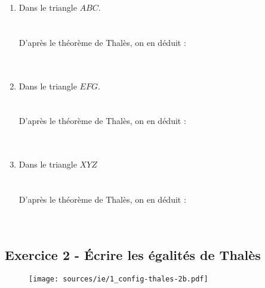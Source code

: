 \documentclass[12pt]{article}
\begin{document}
\begin{multicols}{3}
  \begin{enumerate}
  \item Dans le triangle $ABC$.\\ 
  \phantom{abc}\\
  \phantom{abc}\\
  D'après le théorème de Thalès, on en déduit :\\
   \phantom{abc}\\
  \phantom{abc}\\
  \item Dans le triangle $EFG$.\\ 
  \phantom{abc}\\
  \phantom{abc}\\
  D'après le théorème de Thalès, on en déduit :\\
  \phantom{abc}\\
  \phantom{abc}\\
  \item Dans le triangle $XYZ$\\
  \phantom{abc}\\
  \phantom{abc}\\
  D'après le théorème de Thalès, on en déduit :\\
  \phantom{abc}\\
  \phantom{abc}\\
  \end{enumerate}
\end{multicols}

\vspace{0.3cm}
\noindent\hrulefill
\vspace{0.3cm}

\subsection*{Exercice 2 - Écrire les égalités de Thalès}

\begin{figure}[H]
  \centering
  \texttt{[image: sources/ie/1\_config-thales-2b.pdf]}
\end{figure}
\end{document}
